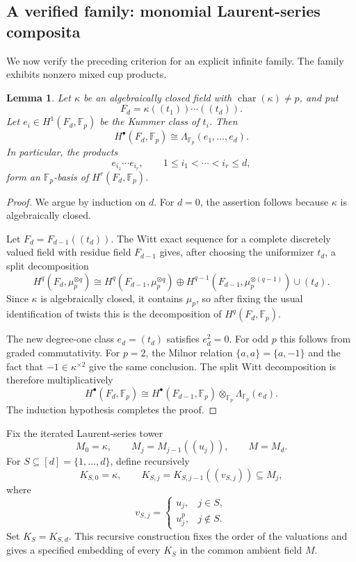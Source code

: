 \documentclass[12pt]{amsart}
\theoremstyle{plain}
\newtheorem{lemma}[theorem]{Lemma}
\theoremstyle{definition}
\theoremstyle{remark}
\numberwithin{equation}{section}
\newcommand{\Fp}{\mathbb{F}_p}
\begin{document}
\subsection{A verified family: monomial Laurent-series composita}
\label{subsec:laurent-composita}

We now verify the preceding criterion for an explicit infinite family.
The family exhibits nonzero mixed cup products.

\begin{lemma}
\label{lem:laurent-cohomology}
Let \(\kappa\) be an algebraically closed field with
\(\operatorname{char}(\kappa)\neq p\), and put
\[
F_d=\kappa((t_1))\cdots((t_d)).
\]
Let \(e_i\in H^1(F_d,\Fp)\) be the Kummer class of \(t_i\).
Then
\[
H^\bullet(F_d,\Fp)
\cong
\Lambda_{\Fp}(e_1,\dots,e_d).
\]
In particular, the products
\[
e_{i_1}\cdots e_{i_r},
\qquad
1\leq i_1<\cdots<i_r\leq d,
\]
form an \(\Fp\)-basis of \(H^r(F_d,\Fp)\).
\end{lemma}

\begin{proof}
We argue by induction on \(d\). For \(d=0\), the assertion follows
because \(\kappa\) is algebraically closed.

Let \(F_d=F_{d-1}((t_d))\). The Witt exact sequence for a complete
discretely valued field with residue field \(F_{d-1}\)
\cite[Proposition~7.7]{GaribaldiMerkurjevSerre} gives, after choosing
the uniformizer \(t_d\), a split decomposition
\[
H^q(F_d,\mu_p^{\otimes q})
\cong
H^q(F_{d-1},\mu_p^{\otimes q})
\oplus
H^{q-1}(F_{d-1},\mu_p^{\otimes(q-1)})\cup(t_d).
\]
Since \(\kappa\) is algebraically closed, it contains \(\mu_p\), so
after fixing the usual identification of twists this is the
decomposition of \(H^q(F_d,\Fp)\).

The new degree-one class \(e_d=(t_d)\) satisfies \(e_d^2=0\).
For odd \(p\) this follows from graded commutativity. For \(p=2\),
the Milnor relation \(\{a,a\}=\{a,-1\}\) and the fact that
\(-1\in\kappa^{\times2}\) give the same conclusion. The split Witt
decomposition is therefore multiplicatively
\[
H^\bullet(F_d,\Fp)
\cong
H^\bullet(F_{d-1},\Fp)\otimes_{\Fp}\Lambda_{\Fp}(e_d).
\]
The induction hypothesis completes the proof.
\end{proof}

Fix the iterated Laurent-series tower
\[
M_0=\kappa,
\qquad
M_j=M_{j-1}((u_j)),
\qquad
M=M_d.
\]
For \(S\subseteq[d]=\{1,\dots,d\}\), define recursively
\[
K_{S,0}=\kappa,
\qquad
K_{S,j}=K_{S,j-1}((v_{S,j}))\subseteq M_j,
\]
where
\[
v_{S,j}
=
\begin{cases}
u_j,&j\in S,\\
u_j^p,&j\notin S.
\end{cases}
\]
Set \(K_S=K_{S,d}\). This recursive construction fixes the order of the
valuations and gives a specified embedding of every \(K_S\) in the common
ambient field \(M\).
\end{document}
